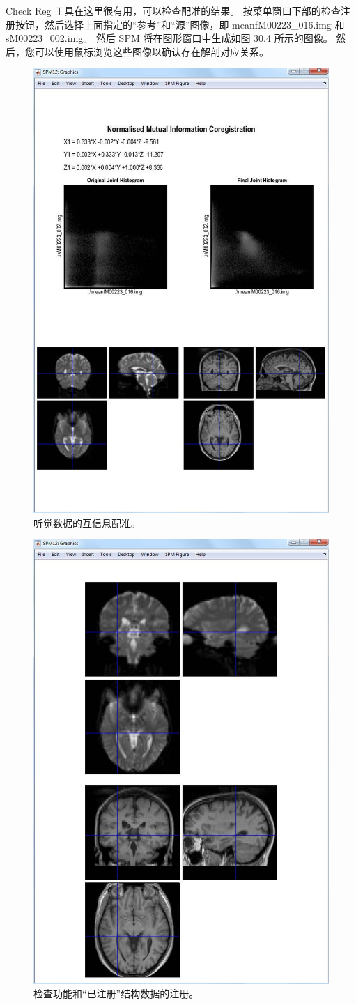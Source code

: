 Check Reg 工具在这里很有用，可以检查配准的结果。 按菜单窗口下部的检查注册按钮，然后选择上面指定的“参考”和“源”图像，即 meanfM00223\_016.img 和 sM00223\_002.img。 然后 SPM 将在图形窗口中生成如图 30.4 所示的图像。 然后，您可以使用鼠标浏览这些图像以确认存在解剖对应关系。

\begin{figure}[htbp]
	\centering
	\includegraphics[width=0.6\linewidth]{part7/figs/fig_30_3}
	\caption{听觉数据的互信息配准。}
	\label{mutual_information}
\end{figure}

\begin{figure}[htbp]
	\centering
	\includegraphics[width=0.6\linewidth]{part7/figs/fig_30_4}
	\caption{检查功能和“已注册”结构数据的注册。}
	\label{checking_registration}
\end{figure}

